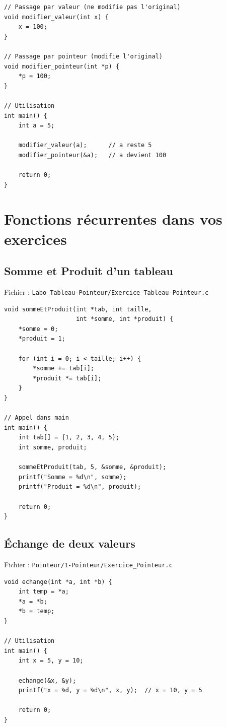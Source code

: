\documentclass[12pt,a4paper]{article}
\begin{document}
\begin{lstlisting}
// Passage par valeur (ne modifie pas l'original)
void modifier_valeur(int x) {
    x = 100;
}

// Passage par pointeur (modifie l'original)
void modifier_pointeur(int *p) {
    *p = 100;
}

// Utilisation
int main() {
    int a = 5;
    
    modifier_valeur(a);      // a reste 5
    modifier_pointeur(&a);   // a devient 100
    
    return 0;
}
\end{lstlisting}

\section{Fonctions récurrentes dans vos exercices}

\subsection{Somme et Produit d'un tableau}

Fichier : \texttt{Labo\_Tableau-Pointeur/Exercice\_Tableau-Pointeur.c}

\begin{lstlisting}
void sommeEtProduit(int *tab, int taille, 
                    int *somme, int *produit) {
    *somme = 0;
    *produit = 1;
    
    for (int i = 0; i < taille; i++) {
        *somme += tab[i];
        *produit *= tab[i];
    }
}

// Appel dans main
int main() {
    int tab[] = {1, 2, 3, 4, 5};
    int somme, produit;
    
    sommeEtProduit(tab, 5, &somme, &produit);
    printf("Somme = %d\n", somme);
    printf("Produit = %d\n", produit);
    
    return 0;
}
\end{lstlisting}

\subsection{Échange de deux valeurs}

Fichier : \texttt{Pointeur/1-Pointeur/Exercice\_Pointeur.c}

\begin{lstlisting}
void echange(int *a, int *b) {
    int temp = *a;
    *a = *b;
    *b = temp;
}

// Utilisation
int main() {
    int x = 5, y = 10;
    
    echange(&x, &y);
    printf("x = %d, y = %d\n", x, y);  // x = 10, y = 5
    
    return 0;
}
\end{lstlisting}
\end{document}
